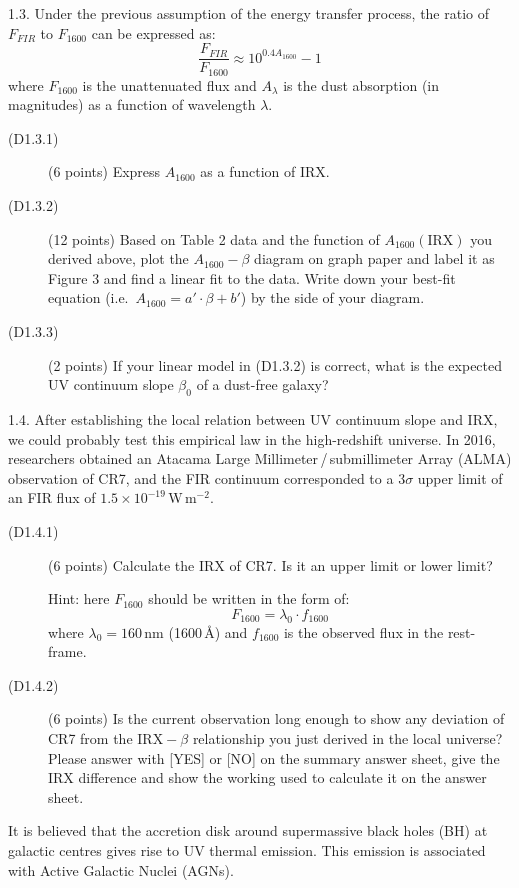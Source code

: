 1.3. Under the previous assumption of the energy transfer process, the ratio
of $F_{FIR}$ to $F_{1600}$ can be expressed as:
\[ \frac{F_{FIR}}{F_{1600}} \approx 10^{0.4 A_{1600}} - 1 \]
where $F_{1600}$ is the unattenuated flux and $A_\lambda$ is the dust
absorption (in magnitudes) as a function of wavelength $\lambda$.

\begin{description}
\item[(D1.3.1)] (6 points) Express $A_{1600}$ as a function of IRX.
\item[(D1.3.2)] (12 points) Based on Table 2 data and the function of
  $A_{1600}(\mathrm{IRX})$ you derived above, plot the $A_{1600}-\beta$
  diagram on graph paper and label it as Figure 3 and find a linear fit to the
  data. Write down your best-fit equation (i.e.\
  $A_{1600} = a' \cdot \beta + b'$) by the side of your diagram.
\item[(D1.3.3)] (2 points) If your linear model in (D1.3.2) is correct, what
  is the expected UV continuum slope $\beta_0$ of a dust-free galaxy?
\end{description}

1.4. After establishing the local relation between UV continuum slope and IRX,
we could probably test this empirical law in the high-redshift universe. In
2016, researchers obtained an Atacama Large Millimeter\,/\,submillimeter Array
(ALMA) observation of CR7, and the FIR continuum corresponded to a $3\sigma$
upper limit of an FIR flux of $1.5 \times 10^{-19}$\,W\,m$^{-2}$.

\begin{description}
\item[(D1.4.1)] (6 points) Calculate the IRX of CR7. Is it an upper limit or
  lower limit?

  Hint: here $F_{1600}$ should be written in the form of:
  \[ F_{1600} = \lambda_0 \cdot f_{1600} \]
  where $\lambda_0 = 160$\,nm (1600\,\AA) and $f_{1600}$ is the observed flux
  in the rest-frame.
\item[(D1.4.2)] (6 points) Is the current observation long enough to show any
  deviation of CR7 from the $\mathrm{IRX}-\beta$ relationship you just derived
  in the local universe? Please answer with [YES] or [NO] on the summary
  answer sheet, give the IRX difference and show the working used to calculate
  it on the answer sheet.
\end{description}

It is believed that the accretion disk around supermassive black holes (BH) at
galactic centres gives rise to UV thermal emission. This emission is
associated with Active Galactic Nuclei (AGNs).

